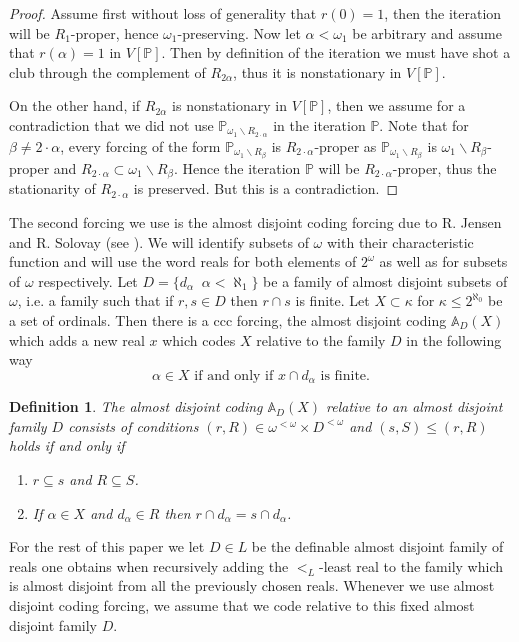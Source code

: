 \documentclass[a4paper,11pt]{article}
\newtheorem{definition}[theorem]{Definition}
\newcommand{\forceP}{\mathbb{P}}
\begin{document}
\begin{proof}
Assume first without loss of generality that $r(0)=1$, then the iteration will be $ R_1$-proper, hence $\omega_1$-preserving. Now let $\alpha < \omega_1$ be arbitrary and assume that $r(\alpha)=1$ in $V[{\forceP}]$. Then by definition of the iteration
 we must have shot a club through the complement of $R_{2 \alpha}$, thus it is nonstationary
 in $V[{\forceP}]$. 
 
 On the other hand, if $R_{2 \alpha}$ is nonstationary in $V[{\forceP}]$, then we assume for a contradiction that we did not use $\forceP_{\omega_1 \backslash R_{ 2 \cdot \alpha}}$ in the iteration $\forceP$.
Note that for $\beta \ne 2 \cdot \alpha$, every forcing of the form $\forceP_{\omega_1 \backslash R_{\beta}}$ is $R_{2 \cdot \alpha}$-proper as $\forceP_{\omega_1 \backslash R_{\beta}}$ is $\omega_1 \backslash R_{\beta}$-proper and $R_{2\cdot \alpha} \subset \omega_1 \backslash R_{\beta}$.
 Hence the iteration $\forceP$ will  be $R_{2 \cdot \alpha}$-proper, thus the stationarity of $R_{2 \cdot \alpha}$ is preserved. But this is a contradiction.

 \end{proof}

The second forcing we use is the almost disjoint coding forcing due to R. Jensen and R. Solovay (see \cite{JensenSolovay}). We will identify subsets of $\omega$ with their characteristic function and will use the word reals for both elements of $2^{\omega}$ as well as for subsets of $\omega$ respectively.
Let $D=\{d_{\alpha} \, \: \, \alpha < \aleph_1 \}$ be a family of almost disjoint subsets of $\omega$, i.e. a family such that if $r, s \in D$ then 
$r \cap s$ is finite. Let $X\subset  \kappa$ for $\kappa \le 2^{\aleph_0}$ be a set of ordinals. Then there 
is a ccc forcing, the almost disjoint coding $\mathbb{A}_D(X)$ which adds 
a new real $x$ which codes $X$ relative to the family $D$ in the following way
$$\alpha \in X \text{ if and only if } x \cap d_{\alpha} \text{ is finite.}$$
\begin{definition}
 The almost disjoint coding $\mathbb{A}_D(X)$ relative to an almost disjoint family $D$ consists of
 conditions $(r, R) \in \omega^{<\omega} \times D^{<\omega}$ and
 $(s,S) \le (r,R)$ holds if and only if
 \begin{enumerate}
  \item $r \subseteq s$ and $R \subseteq S$.
  \item If $\alpha \in X$ and $d_{\alpha} \in R$ then $r \cap d_{\alpha} = s \cap d_{\alpha}$.
 \end{enumerate}
\end{definition}
For the rest of this paper we let $D \in L$ be the definable almost disjoint family of reals one obtains when recursively adding the $<_L$-least real to the family which is almost disjoint from all the previously chosen reals. 
Whenever we use almost disjoint coding forcing, we assume that we code relative to this fixed almost disjoint family $D$.
\end{document}
